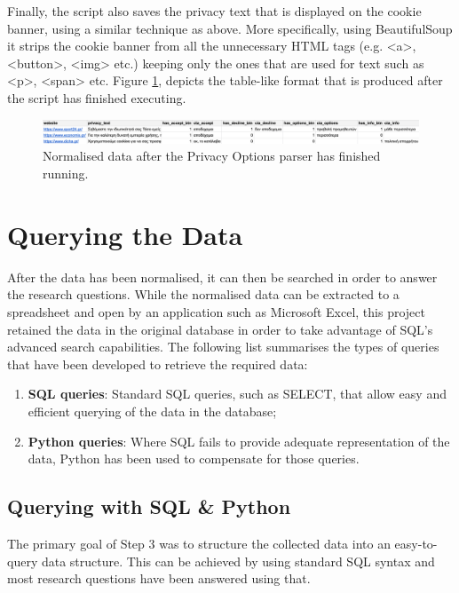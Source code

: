 \documentclass[../main.tex]{subfiles}
\begin{document}
Finally, the script also saves the privacy text that is displayed on the cookie banner, using a similar technique as above. More specifically, using BeautifulSoup it strips the cookie banner from all the unnecessary HTML tags (e.g. {\selectfont <a>}, {\selectfont <button>}, {\selectfont <img>} etc.) keeping only the ones that are used for text such as {\selectfont <p>}, {\selectfont <span>} etc. Figure \ref{fig:impl_privacy_options_normalised}, depicts the table-like format that is produced after the script has finished executing. 

\begin{figure}[ht]
    \centering
    \includegraphics[width=\textwidth]{images/implementation/normalised_data.png}
    \caption{Normalised data after the Privacy Options parser has finished running.}
    \label{fig:impl_privacy_options_normalised}
\end{figure}

\section{Querying the Data}
After the data has been normalised, it can then be searched in order to answer the research questions. While the normalised data can be extracted to a spreadsheet and open by an application such as Microsoft Excel, this project retained the data in the original database in order to take advantage of SQL’s advanced search capabilities. The following list summarises the types of queries that have been developed to retrieve the required data: 

\begin{enumerate}
    \item \textbf{SQL queries}: Standard SQL queries, such as SELECT, that allow easy and efficient querying of the data in the database;
    
    \item \textbf{Python queries}: Where SQL fails to provide adequate representation of the data, Python has been used to compensate for those queries.
\end{enumerate}

\subsection{Querying with SQL \& Python}
The primary goal of Step 3 was to structure the collected data into an easy-to-query data structure. This can be achieved by using standard SQL syntax \cite{bowman1996practical} and most research questions have been answered using that. 
\end{document}
